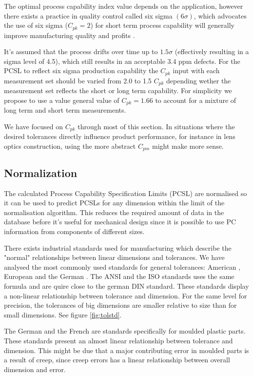 \documentclass[aip,amsmath, reprint, author-year]{revtex4-1}
\begin{document}
The optimal process capability index value depends on the application, however there exists a practice in quality control called six sigma $(6 \sigma)$, which advocates the use of six sigma ($C_{pk} = 2$) for short term process capability will generally improve manufacturing quality and profits \cite{koch2004design}. 

It's assumed that the process drifts over time up to $1.5 \sigma$  (effectively resulting in a sigma level of 4.5), which still results in an acceptable 3.4 ppm defects.
For the PCSL to reflect six sigma production capability the $C_{pk}$ input with each measurement set should be varied from 2.0 to 1.5 $C_{pk}$ depending wether the measurement set reflects the short or long term capability. 
For simplicity we propose to use a value general value of $C_{pk} = 1.66$ to account for a  mixture of long term and short term measurements. 

We have focused on $C_{pk}$ through most of this section.
In situations where the desired tolerances directly influence product performance, for instance in lens optics construction, using the more abstract $C_{pm}$ might make more sense. 


\subsection{Normalization}
The calculated Process Capability Specification Limits (PCSL) are normalised so it can be used to predict PCSLs for any dimension within the limit of the normalisation algorithm. 
This reduces the required amount of data in the database before it's useful for mechanical design since it is possible to use PC information from components of different sizes.

There exists industrial standards used for manufacturing which describe the "normal" relationships between linear dimensions and tolerances. We have analysed the most commonly used standards for general tolerances: American \citeauthor{american1978preferred}, European \citeauthor{ISO286} and the German \citeauthor{DIN7168}. The ANSI and the ISO standards uses the same formula and are quire close to the german DIN standard. 
These standards display a non-linear relationship between tolerance and dimension. For the same level for precision, the tolerances of big dimensions are smaller relative to size than for small dimensions. See figure \ref{fig:tolstd}.

The German \citeauthor{DIN16901} and the French \citeauthor{NFT58000} are standards specifically for moulded plastic parts. These standards present an almost linear relationship between tolerance and dimension. This might be due that a major contributing error in moulded parts is a result of creep, since creep errors has a linear relationship between overall dimension and error.
\end{document}
